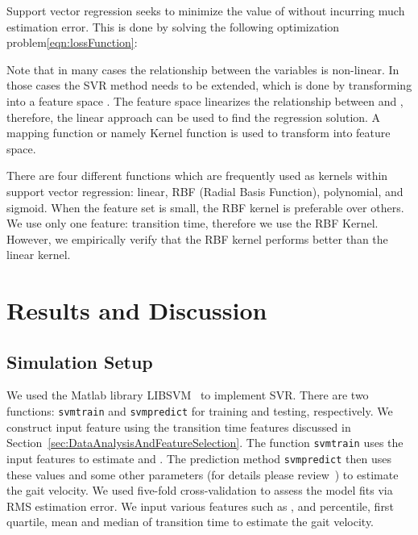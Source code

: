 \documentclass[journal]{IEEEtran}
\begin{document}
Support vector regression seeks to minimize the value of  without incurring much estimation error. This is done by solving the following optimization problem\eqref{eqn:lossFunction}:



Note that in many cases the relationship between the variables is non-linear. 
In those cases the SVR method needs to be extended, which is done by transforming  into a feature space . The feature space linearizes  
the  relationship between  and , therefore, the linear approach can be used to find the regression solution. A mapping function or namely Kernel function is used to transform into feature space. 

There are four different functions which are frequently used as kernels within support vector regression: linear, RBF (Radial Basis Function), polynomial, and sigmoid. When the feature set is small, the RBF kernel is preferable over others. We use only one feature: transition time, therefore we use the RBF Kernel. However, we empirically verify that the RBF kernel performs better than the linear kernel. 







\section{Results and Discussion}
\subsection{Simulation Setup}
We used the Matlab library LIBSVM~\cite{chang2011libsvm} to implement SVR. There are two functions: \texttt{svmtrain} and \texttt{svmpredict} for training and testing, respectively. We construct input feature  using the transition time features discussed in Section~\ref{sec:DataAnalysisAndFeatureSelection}. The function \texttt{svmtrain} uses the input features to estimate  and . The prediction method \texttt{svmpredict} then uses these values and some other parameters (for details please review~\cite{chang2011libsvm}) to estimate the gait velocity. We used five-fold cross-validation to assess the model fits via RMS estimation error.  We input various features such as ,  and  percentile, first quartile, mean and median of transition time to estimate the gait velocity.
\end{document}
